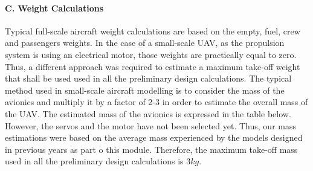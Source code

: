 \documentclass[12pt]{article}
\begin{document}
\paragraph{C. Weight Calculations}
Typical full-scale aircraft weight calculations are based on the empty, fuel, crew and passengers weights. In the case of a small-scale UAV, as the propulsion system is using an electrical motor, those weights are practically equal to zero. Thus, a different approach was required to estimate a maximum take-off weight that shall be used used in all the preliminary design calculations. The typical method used in small-scale aircraft modelling is to consider the mass of the avionics and multiply it by a factor of 2-3 in order to estimate the overall mass of the UAV. The estimated mass of the avionics is expressed in the table below. 
However, the servos and the motor have not been selected yet. Thus, our mass estimations were based on the average mass experienced by the models designed in previous years as part o this module. Therefore, the maximum take-off mass used in all the preliminary design calculations is $3kg$. \\
\end{document}
